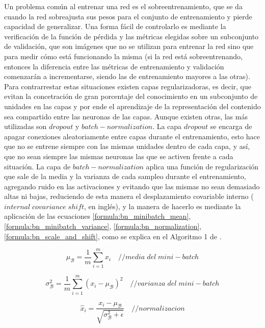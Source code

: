  Un problema común al entrenar una red es el sobreentrenamiento, que se da cuando la red sobreajusta sus pesos para el conjunto de entrenamiento y pierde capacidad de generalizar. Una forma fácil de controlarlo es mediante la verificación de la función de pérdida y las métricas elegidas sobre un subconjunto de validación, que son imágenes que no se utilizan para entrenar la red sino que para medir cómo está funcionando la misma (si la red está sobreentrenando, entonces la diferencia entre las métricas de entrenamiento y validación comenzarán a incrementarse, siendo las de entrenamiento mayores a las otras). Para contrarrestar estas situaciones existen capas regularizadoras, es decir, que evitan la concetración de gran porcentaje del conocimiento en un subconjunto de unidades en las capas y por ende el aprendizaje de la representación del contenido sea compartido entre las neuronas de las capas. Aunque existen otras, las más utilizadas son \(dropout\) y \(batch-normalization\). La capa \(dropout\) se encarga de apagar conexiones aleatoriamente entre capas durante el entrenamiento, esto hace que no se entrene siempre con las mismas unidades dentro de cada capa, y así, que no sean siempre las mismas neuronas las que se activen frente a cada situación. La capa de \(batch-normalization\) aplica una función de regularización que sale de la media y la varianza de cada sampleo durante el entrenamiento, agregando ruido en las activaciones y evitando que las mismas no sean demasiado altas ni bajas, reduciendo de esta manera el desplazamiento covariable interno (\(internal\;covariance\; shift\), en inglés), y la manera de hacerlo es mediante la aplicación de las ecuaciones \ref{formula:bn_minibatch_mean}, \ref{formula:bn_minibatch_variance}, \ref{formula:bn_normalization}, \ref{formula:bn_scale_and_shift}, como se explica en el Algoritmo 1 de \cite{BatchNorm}.
 
 
 \begin{equation}\label{formula:bn_minibatch_mean}
 \mu_{\mathcal{B}} = \frac{1}{m} \sum_{i=1}^{m} x_{i}
\quad { // media\; del \; mini-batch}
 \end{equation}
 
 \begin{equation}\label{formula:bn_minibatch_variance}
 \sigma_{\mathcal{B}}^{2} = \frac{1}{m} \sum_{i=1}^{m}\left(x_{i}-\mu_{\mathcal{B}}\right)^{2}
\quad { // varianza \; del \; mini-batch}
 \end{equation}
 
 \begin{equation}\label{formula:bn_normalization}
 \widehat{x}_{i} = \frac{x_{i}-\mu_{\mathcal{B}}}{\sqrt{\sigma_{\mathcal{B}}^{2}+\epsilon}}
\quad { // normalizacion}
 \end{equation}
 
